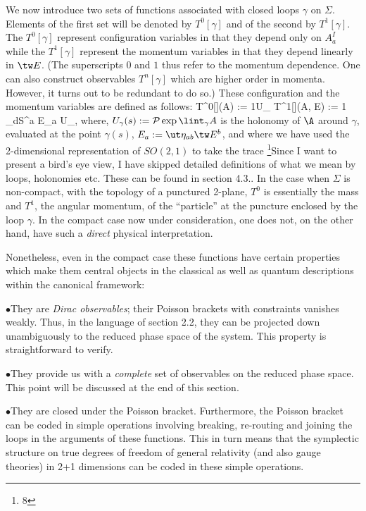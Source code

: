 We now introduce two sets of functions associated with closed loops $\gamma$
on $\Sigma$. Elements of the first set will be denoted by $T^0[\gamma ]$
and of the second by $T^1[\gamma]$. The $T^0[\gamma ]$ represent configuration
variables in that they depend only on $A_a^I$ while the $T^1[\gamma ]$
represent the momentum variables in that they depend linearly in $\tw E$.
(The superscripts $0$ and $1$ thus refer to the momentum dependence. One can
also construct observables $T^n[\gamma ]$ which are higher order in momenta.
However, it turns out to be redundant to do so.) These configuration and the
momentum variables are defined as follows:
\bneq
T^0[\gamma ](A) := {1}\tr U_\gamma {} \qquad
T^1[\gamma ](A, \tw E) := {1} \loint_\gamma dS^a\> \tr E_a U_\gamma ,
where, $U_\gamma (s) := {\cal P}\exp\lint_\gamma A$ is the holonomy of $\A$
around $\gamma$, evaluated at the point $\gamma (s)$, $E_a := \ut\eta_{ab}
\tw E^b$, and where we have used the 2-dimensional representation of $SO(2,1)$
to take the trace
\footnote{8}{Since I want to present a bird's eye view, I have skipped
detailed definitions of what we mean by loops, holonomies etc. These can be
found in section 4.3.}.
In the case when $\Sigma$ is non-compact, with the
topology of a punctured 2-plane, $T^0$ is essentially the mass and $T^1$, the
angular momentum, of the ``particle'' at the puncture enclosed by the loop
$\gamma$. In the compact case now under consideration, one does not,
on the other hand, have such a {\it direct} physical interpretation.

Nonetheless, even in the compact case these functions have certain properties
which make them central objects in the classical as well as quantum
descriptions within the canonical framework:
\item{$\bullet$}{They are {\it Dirac observables}; their Poisson brackets
with constraints vanishes weakly. Thus, in the language of section 2.2, they
can be projected down unambiguously to the reduced phase space of the system.
This property is straightforward to verify.}
\item{$\bullet$}{They provide us with a {\it complete} set of observables on
the reduced phase space. This point will be discussed at the end of this
section.}
\item{$\bullet$}{They are closed under the Poisson bracket. Furthermore, the
Poisson bracket can be coded in simple operations involving breaking,
re-routing and joining the loops in the arguments of these functions. This
in turn means that the symplectic structure on true degrees of freedom of
general relativity (and also gauge theories) in 2+1 dimensions can be coded
in these simple operations.}

